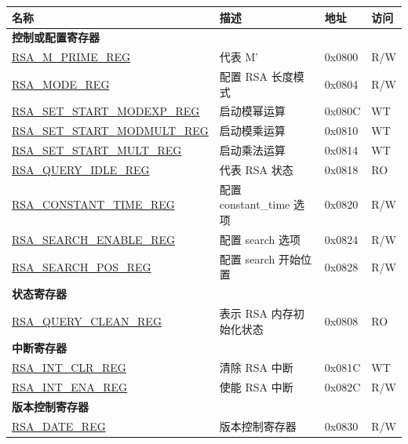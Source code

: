 \begin{longtable}{ | l | l | l | l | }
\hline\rowcolor{lightgray}
\textbf{名称} & \textbf{描述} &  \textbf{地址} & \textbf{访问} \\ \hline
\multicolumn{4}{|l|}{\textbf{控制或配置寄存器}} \\ \hline
\hyperref[regdesc:RSAMPRIMEREG]{RSA\_M\_PRIME\_REG} & 代表 M’ & 0x0800 & R/W \\ \hline
\hyperref[regdesc:RSAMODEREG]{RSA\_MODE\_REG} & 配置 RSA 长度模式 & 0x0804 & R/W \\ \hline
\hyperref[regdesc:RSASETSTARTMODEXPREG]{RSA\_SET\_START\_MODEXP\_REG} & 启动模幂运算 & 0x080C & WT \\ \hline
\hyperref[regdesc:RSASETSTARTMODMULTREG]{RSA\_SET\_START\_MODMULT\_REG} & 启动模乘运算 & 0x0810 & WT \\ \hline
\hyperref[regdesc:RSASETSTARTMULTREG]{RSA\_SET\_START\_MULT\_REG} & 启动乘法运算 & 0x0814 & WT \\ \hline
\hyperref[regdesc:RSAQUERYIDLEREG]{RSA\_QUERY\_IDLE\_REG} & 代表 RSA 状态 & 0x0818 & RO \\ \hline
\hyperref[regdesc:RSACONSTANTTIMEREG]{RSA\_CONSTANT\_TIME\_REG} & 配置 constant\_time 选项 & 0x0820 & R/W \\ \hline
\hyperref[regdesc:RSASEARCHENABLEREG]{RSA\_SEARCH\_ENABLE\_REG} & 配置 search 选项 & 0x0824 & R/W \\ \hline
\hyperref[regdesc:RSASEARCHPOSREG]{RSA\_SEARCH\_POS\_REG} & 配置 search 开始位置 & 0x0828 & R/W \\ \hline
\multicolumn{4}{|l|}{\textbf{状态寄存器}} \\ \hline
\hyperref[regdesc:RSAQUERYCLEANREG]{RSA\_QUERY\_CLEAN\_REG} & 表示 RSA 内存初始化状态  & 0x0808 & RO \\ \hline
\multicolumn{4}{|l|}{\textbf{中断寄存器}} \\ \hline
\hyperref[regdesc:RSAINTCLRREG]{RSA\_INT\_CLR\_REG} & 清除 RSA 中断 & 0x081C & WT \\ \hline
\hyperref[regdesc:RSAINTENAREG]{RSA\_INT\_ENA\_REG} & 使能 RSA 中断 & 0x082C & R/W \\ \hline
\multicolumn{4}{|l|}{\textbf{版本控制寄存器}} \\ \hline
\hyperref[regdesc:RSADATEREG]{RSA\_DATE\_REG} & 版本控制寄存器 & 0x0830 & R/W \\ \hline
\end{longtable}
